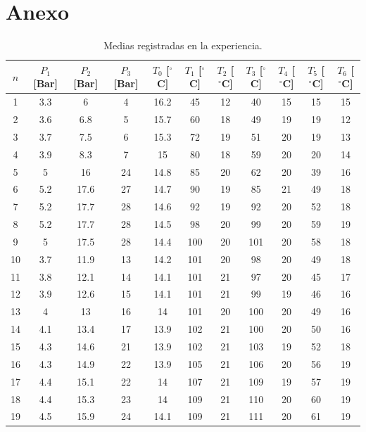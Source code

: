 \documentclass[11pt,letterpaper]{extarticle}        %
\numberwithin{equation}{section}                    %
\newcommand{\grados}{^{\circ}}                      %
\begin{document}
\section{Anexo}
\setcounter{section}{1}
\renewcommand*\thesection{\Alph{section}}
\begin{table}[H]
\centering
\caption{Medias registradas en la experiencia.}
\label{t:Medidas}
\begin{tabular}{|ccccccccccc|}
\hline
$n$ & $P_1$ {[}Bar{]} & $P_2$ {[}Bar{]} & $P_3$ {[}Bar{]} & $T_0$  {[}$\grados$C{]} & $T_1$  {[}$\grados$C{]} & $T_2$  {[}$\grados$C{]} & $T_3$  {[}$\grados$C{]} & $T_4$  {[}$\grados$C{]} & $T_5$  {[}$\grados$C{]} & $T_6$  {[}$\grados$C{]} \\
\hline \hline
1 & 3.3 & 6 & 4 & 16.2 & 45 & 12 & 40 & 15 & 15 & 15 \\
2 & 3.6 & 6.8 & 5 & 15.7 & 60 & 18 & 49 & 19 & 19 & 12 \\
3 & 3.7 & 7.5 & 6 & 15.3 & 72 & 19 & 51 & 20 & 19 & 13 \\
4 & 3.9 & 8.3 & 7 & 15 & 80 & 18 & 59 & 20 & 20 & 14 \\
5 & 5 & 16 & 24 & 14.8 & 85 & 20 & 62 & 20 & 39 & 16 \\
6 & 5.2 & 17.6 & 27 & 14.7 & 90 & 19 & 85 & 21 & 49 & 18 \\
7 & 5.2 & 17.7 & 28 & 14.6 & 92 & 19 & 92 & 20 & 52 & 18 \\
8 & 5.2 & 17.7 & 28 & 14.5 & 98 & 20 & 99 & 20 & 59 & 19 \\
9 & 5 & 17.5 & 28 & 14.4 & 100 & 20 & 101 & 20 & 58 & 18 \\
10 & 3.7 & 11.9 & 13 & 14.2 & 101 & 20 & 98 & 20 & 49 & 18 \\
11 & 3.8 & 12.1 & 14 & 14.1 & 101 & 21 & 97 & 20 & 45 & 17 \\
12 & 3.9 & 12.6 & 15 & 14.1 & 101 & 21 & 99 & 19 & 46 & 16 \\
13 & 4 & 13 & 16 & 14 & 101 & 20 & 100 & 20 & 49 & 16 \\
14 & 4.1 & 13.4 & 17 & 13.9 & 102 & 21 & 100 & 20 & 50 & 16 \\
15 & 4.3 & 14.6 & 21 & 13.9 & 102 & 21 & 103 & 19 & 52 & 18 \\
16 & 4.3 & 14.9 & 22 & 13.9 & 105 & 21 & 106 & 20 & 56 & 19 \\
17 & 4.4 & 15.1 & 22 & 14 & 107 & 21 & 109 & 19 & 57 & 19 \\
18 & 4.4 & 15.3 & 23 & 14 & 109 & 21 & 110 & 20 & 60 & 19 \\
19 & 4.5 & 15.9 & 24 & 14.1 & 109 & 21 & 111 & 20 & 61 & 19 \\

\end{tabular}
\end{table}
\end{document}
